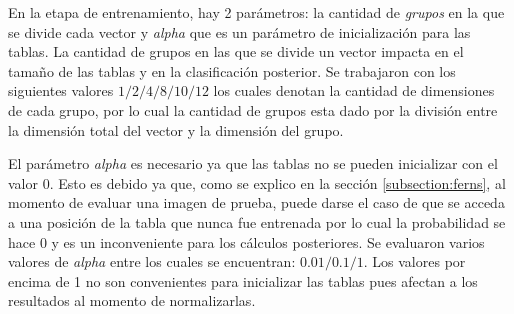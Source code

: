 	En la etapa de entrenamiento, hay 2 parámetros: la cantidad de \textit{grupos} en la que se divide cada vector y \textit{alpha} que es un parámetro de inicialización para las tablas. La cantidad de grupos en las que se divide un vector impacta en el tamaño de las tablas y en la clasificación posterior. Se trabajaron con los siguientes valores $1/2/4/8/10/12$ los cuales denotan la cantidad de dimensiones de cada grupo, por lo cual  la cantidad de grupos esta dado por la división entre la dimensión total del vector y la dimensión del grupo.

	El parámetro \textit{alpha} es necesario ya que las tablas no se pueden inicializar con el valor $0$. Esto es debido ya que, como se explico en la sección \ref{subsection:ferns}, al momento de evaluar una imagen de prueba, puede darse el caso de que se acceda a una posición de la tabla que nunca fue entrenada por lo cual la probabilidad se hace 0 y es un inconveniente para los cálculos posteriores. Se evaluaron varios valores de \textit{alpha} entre los cuales se encuentran: $0.01/0.1/1$. Los valores por encima de 1 no son convenientes para inicializar las tablas pues afectan a los resultados al momento de normalizarlas.
